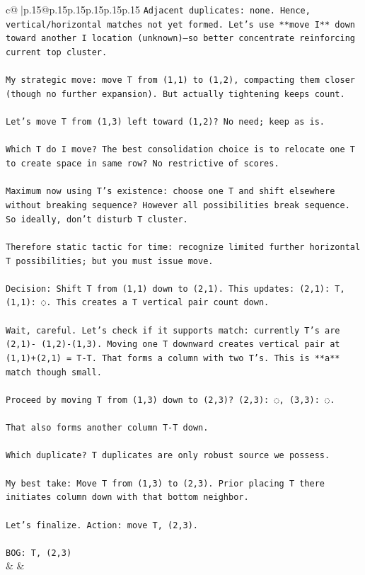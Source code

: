 \documentclass{article}
\begin{document}
{\begin{supertabular}{c@{$\;$}|p{.15\linewidth}@{}p{.15\linewidth}p{.15\linewidth}p{.15\linewidth}p{.15\linewidth}p{.15\linewidth}}
{{{\texttt{Adjacent duplicates: none. Hence, vertical/horizontal matches not yet formed. Let's use **move I** down toward another I location (unknown)—so better concentrate reinforcing current top cluster.} \\
\\ 
\texttt{My strategic move: move T from (1,1) to (1,2), compacting them closer (though no further expansion). But actually tightening keeps count.} \\
\\ 
\texttt{Let's move T from (1,3) left toward (1,2)? No need; keep as is.} \\
\\ 
\texttt{Which T do I move? The best consolidation choice is to relocate one T to create space in same row? No restrictive of scores.} \\
\\ 
\texttt{Maximum now using T's existence: choose one T and shift elsewhere without breaking sequence? However all possibilities break sequence. So ideally, don't disturb T cluster.} \\
\\ 
\texttt{Therefore static tactic for time: recognize limited further horizontal T possibilities; but you must issue move.} \\
\\ 
\texttt{Decision: Shift T from (1,1) down to (2,1). This updates: (2,1): T, (1,1): ◌. This creates a T vertical pair count down.} \\
\\ 
\texttt{Wait, careful. Let's check if it supports match: currently T's are (2,1){-} (1,2){-}(1,3). Moving one T downward creates vertical pair at (1,1)+(2,1) = T{-}T. That forms a column with two T's. This is **a** match though small.} \\
\\ 
\texttt{Proceed by moving T from (1,3) down to (2,3)?  (2,3): ◌, (3,3): ◌.} \\
\\ 
\texttt{That also forms another column T{-}T down.} \\
\\ 
\texttt{Which duplicate? T duplicates are only robust source we possess.} \\
\\ 
\texttt{My best take: Move T from (1,3) to (2,3). Prior placing T there initiates column down with that bottom neighbor.} \\
\\ 
\texttt{Let's finalize. Action: move T, (2,3).} \\
\\ 
\texttt{BOG: T, (2,3)} \\
            }
        }
    }
    & & \\ \\


\end{supertabular}}
\end{document}
